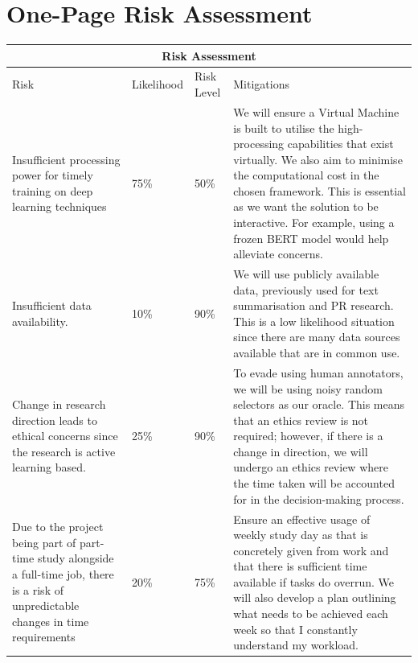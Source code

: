 \documentclass[ %
                    author={James Stephenson},
                supervisor={Dr. Edwin Simpson},
                    degree={MSc},
                     title={PROJECT PLAN},
                  subtitle={ Bayesian Deep Learning For Extractive Test Summarisation},
                      type={},
                      year={2022}]{../additions/dissertation}
\begin{document}
	\chapter{One-Page Risk Assessment}
		\label{appx:riskassessment}
		
		\begin{tabular}{ |p{5cm}||p{2cm}|p{2cm}|p{6cm}|  }
 			\hline
 			\multicolumn{4}{|c|}{Risk Assessment} \\
			\hline
 			Risk& Likelihood &Risk Level&Mitigations\\
 			\hline
 			Insufficient processing power for timely training on deep learning techniques   & 75\%    &50\%&  We will ensure a Virtual Machine is built to utilise the high-processing capabilities that exist virtually. We also aim to minimise the computational cost in the chosen framework. This is essential as we want the solution to be interactive. For example, using a frozen BERT model would help alleviate concerns. \\
			\hline
 			Insufficient data availability.&10\% & 90\%  & We will use publicly available data, previously used for text summarisation and PR research. This is a low likelihood situation since there are many data sources available that are in common use. \\
			\hline
 			Change in research direction leads to ethical concerns since the research is active learning based. &25\% & 90\%& To evade using human annotators, we will be using noisy random selectors as our oracle. This means that an ethics review is not required; however, if there is a change in direction, we will undergo an ethics review where the time taken will be accounted for in the decision-making process.\\
			\hline
 			Due to the project being part of part-time study alongside a full-time job, there is a risk of unpredictable changes in time requirements    &20\% & 75\%& Ensure an effective usage of weekly study day as that is concretely given from work and that there is sufficient time available if tasks do overrun. We will also develop a plan outlining what needs to be achieved each week so that I constantly understand my workload.\\
 			\hline
		\end{tabular}
		
\end{document}
